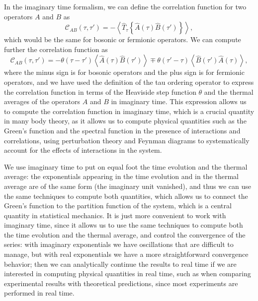 In the imaginary time formalism, we can define the correlation function for two operators \(A\) and \(B\) as
\[
    \mathcal{C}_{AB}(\tau, \tau') = - \left\langle \hat{T}_{\tau} \left\{ \hat{A}(\tau) \hat{B}(\tau') \right\} \right\rangle,
\]
which would be the same for bosonic or fermionic operators. We can compute further the correlation function as
\[
    \mathcal{C}_{AB}(\tau, \tau') = - \theta(\tau - \tau') \left\langle \hat{A}(\tau) \hat{B}(\tau') \right\rangle \mp \theta(\tau' - \tau) \left\langle \hat{B}(\tau') \hat{A}(\tau) \right\rangle,
\]
where the minus sign is for bosonic operators and the plus sign is for fermionic operators, and we have used the definition of the tau ordering operator to express the correlation function in terms of the Heaviside step function \(\theta\) and the thermal averages of the operators \(A\) and \(B\) in imaginary time. This expression allows us to compute the correlation function in imaginary time, which is a crucial quantity in many body theory, as it allows us to compute physical quantities such as the Green's function and the spectral function in the presence of interactions and correlations, using perturbation theory and Feynman diagrams to systematically account for the effects of interactions in the system.

We use imaginary time to put on equal foot the time evolution and the thermal average: the exponentials appearing in the time evolution and in the thermal average are of the same form (the imaginary unit vanished), and thus we can use the same techniques to compute both quantities, which allows us to connect the Green's function to the partition function of the system, which is a central quantity in statistical mechanics. It is just more convenient to work with imaginary time, since it allows us to use the same techniques to compute both the time evolution and the thermal average, and control the convergence of the series: with imaginary exponentials we have oscillations that are difficult to manage, but with real exponentials we have a more straightforward convergence behavior; then we can analytically continue the results to real time if we are interested in computing physical quantities in real time, such as when comparing experimental results with theoretical predictions, since most experiments are performed in real time.

